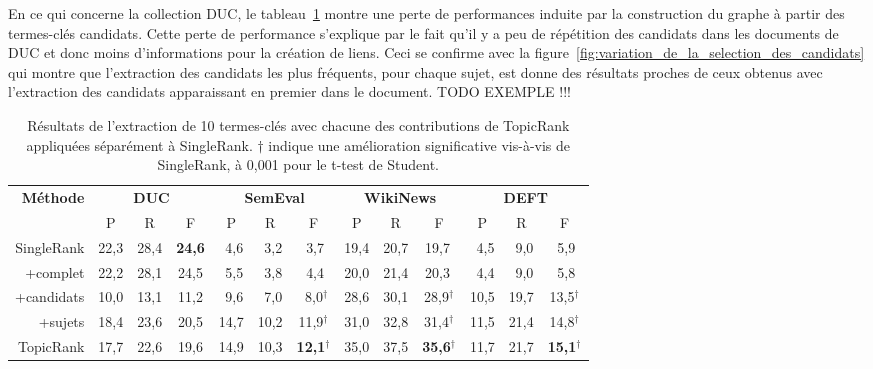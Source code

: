     En ce qui concerne la collection DUC, le
    tableau~\ref{tab:evaluation_individuelle_des_ameliorations} montre une perte
    de performances induite par la construction du graphe à partir des
    termes-clés candidats. Cette perte de performance s'explique par le fait
    qu'il y a peu de répétition des candidats dans les documents de DUC et donc
    moins d'informations pour la création de liens. Ceci se confirme avec la
    figure~\ref{fig:variation_de_la_selection_des_candidats} qui montre que
    l'extraction des candidats les plus fréquents, pour chaque sujet, est donne
    des résultats proches de ceux obtenus avec l'extraction des candidats
    apparaissant en premier dans le document.
    TODO EXEMPLE !!!
    \begin{table}
      \centering
      \begin{tabular}{@{~}r@{~~}c@{~~}c@{~~}c@{~~}c@{~~}c@{~~}c@{~~}c@{~~}c@{~~}c@{~~}c@{~~}c@{~~}c@{~}}
        \toprule
        \multirow{2}{*}[-2pt]{\textbf{Méthode}} & \multicolumn{3}{c}{\textbf{DUC}} & \multicolumn{3}{c}{\textbf{SemEval}} & \multicolumn{3}{c}{\textbf{WikiNews}} & \multicolumn{3}{c}{\textbf{DEFT}}\\
        \cmidrule(r){2-4}\cmidrule(r){5-7}\cmidrule(r){8-10}\cmidrule{11-13}
        & P & R & F & P & R & F & P & R & F & P & R & F\\
        \midrule
        SingleRank & 22,3 & 28,4 & \textbf{24,6} & $~~$4,6 & $~~$3,2 & $~~$3,7$^{~}$ & 19,4 & 20,7 & 19,7$^{~}$ & $~~$4,5 & $~~$9,0 & $~~$5,9$^{~}$\\
        +complet & 22,2 & 28,1 & 24,5 & $~~$5,5 & $~~$3,8 & $~~$4,4$^{~}$ & 20,0 & 21,4 & 20,3${~}$ & $~~$4,4 & $~~$9,0 & $~~$5,8$^{~}$\\
        +candidats & 10,0 & 13,1 & 11,2 & $~~$9,6 & $~~$7,0 & $~~$8,0$^\dagger$ & 28,6 & 30,1 & 28,9$^\dagger$ & 10,5 & 19,7 & 13,5$^\dagger$\\
        +sujets & 18,4 & 23,6 & 20,5 & 14,7 & 10,2 & 11,9$^\dagger$ & 31,0 & 32,8 & 31,4$^\dagger$ & 11,5 & 21,4 & 14,8$^\dagger$\\
        TopicRank & 17,7 & 22,6 & 19,6 & 14,9 & 10,3 & \textbf{12,1}$^\dagger$ & 35,0 & 37,5 & \textbf{35,6}$^\dagger$ & 11,7 & 21,7 & \textbf{15,1}$^\dagger$\\
        \bottomrule
      \end{tabular}
      \caption{Résultats de l'extraction de 10 termes-clés avec chacune des
               contributions de TopicRank appliquées séparément à SingleRank.
               $\dagger$ indique une amélioration significative vis-à-vis de
               SingleRank, à 0,001 pour le t-test de Student.
               \label{tab:evaluation_individuelle_des_ameliorations}}
    \end{table}


